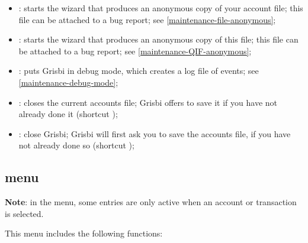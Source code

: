 \begin{itemize}
	\item {}: starts the wizard that produces an anonymous copy of your account file; this file can be attached to a bug report; see \vref{maintenance-file-anonymous};%
	\item {}: starts the wizard that produces an anonymous copy of this file; this file can be attached to a bug report; see \vref{maintenance-QIF-anonymous};%
	\item {}: puts Grisbi in debug mode, which creates a log file of events; see \vref{maintenance-debug-mode};%
	\item {}: closes the current accounts file; Grisbi offers to save it if you have not already done it (shortcut );%
	\item {}: close Grisbi; Grisbi will first ask you to save the accounts file, if you have not already done so (shortcut );%
\end{itemize}


\subsection{ menu\label{home-menus-edit}}

\textbf{Note}: in the  menu, some entries are only active when an account or transaction is selected.

This menu includes the following functions:

